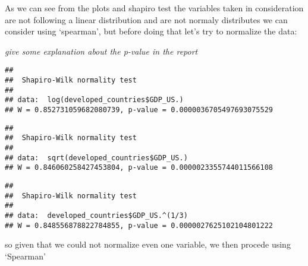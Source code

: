 \documentclass[
]{article}
\newenvironment{Shaded}{\begin{snugshade}}{\end{snugshade}}
\newcommand{\CommentTok}[1]{\textcolor[rgb]{0.56,0.35,0.01}{\textit{#1}}}
\newcommand{\DecValTok}[1]{\textcolor[rgb]{0.00,0.00,0.81}{#1}}
\newcommand{\FunctionTok}[1]{\textcolor[rgb]{0.13,0.29,0.53}{\textbf{#1}}}
\newcommand{\NormalTok}[1]{#1}
\newcommand{\SpecialCharTok}[1]{\textcolor[rgb]{0.81,0.36,0.00}{\textbf{#1}}}
\begin{document}
As we can see from the plots and shapiro test the variables taken in
consideration are not following a linear distribution and are not
normaly distributes we can consider using `spearman', but before doing
that let's try to normalize the data:

\emph{give some explanation about the p-value in the report}

\begin{Shaded}
\end{Shaded}

\begin{verbatim}
## 
##  Shapiro-Wilk normality test
## 
## data:  log(developed_countries$GDP_US.)
## W = 0.852731059682080739, p-value = 0.0000036705497693075529
\end{verbatim}

\begin{Shaded}
\end{Shaded}

\begin{verbatim}
## 
##  Shapiro-Wilk normality test
## 
## data:  sqrt(developed_countries$GDP_US.)
## W = 0.846060258427453804, p-value = 0.0000023355744011566108
\end{verbatim}

\begin{Shaded}
\end{Shaded}

\begin{verbatim}
## 
##  Shapiro-Wilk normality test
## 
## data:  developed_countries$GDP_US.^(1/3)
## W = 0.848556878822784855, p-value = 0.0000027625102104801222
\end{verbatim}

so given that we could not normalize even one variable, we then procede
using `Spearman'
\end{document}
